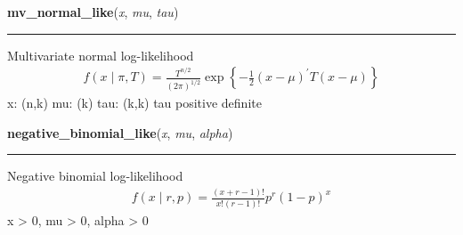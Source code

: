 \hspace{.8\funcindent}\begin{boxedminipage}{\funcwidth}

    \raggedright \textbf{mv\_normal\_like}(\textit{x}, \textit{mu}, \textit{tau})

    \vspace{-1.5ex}

    \rule{\textwidth}{1pt}
\setlength{\parskip}{2ex}

Multivariate normal log-likelihood
\begin{equation*}\begin{split}f(x \mid \pi, T) = \frac{T^{n/2}}{(2\pi)^{1/2}} \exp\left\{ -\frac{1}{2} (x-\mu)^{\prime}T(x-\mu) \right\}\end{split}\end{equation*}
x: (n,k)
mu: (k)
tau: (k,k)
tau positive definite
\setlength{\parskip}{1ex}
    \end{boxedminipage}

    \label{pymc:distributions:negative_binomial_like}

    \vspace{0.5ex}

\hspace{.8\funcindent}\begin{boxedminipage}{\funcwidth}

    \raggedright \textbf{negative\_binomial\_like}(\textit{x}, \textit{mu}, \textit{alpha})

    \vspace{-1.5ex}

    \rule{\textwidth}{1pt}
\setlength{\parskip}{2ex}

Negative binomial log-likelihood
\begin{equation*}\begin{split}f(x \mid r, p) = \frac{(x+r-1)!}{x! (r-1)!} p^r (1-p)^x\end{split}\end{equation*}
x {\textgreater} 0, mu {\textgreater} 0, alpha {\textgreater} 0
\setlength{\parskip}{1ex}
    \end{boxedminipage}

    \label{pymc:distributions:normal_like}

    \vspace{0.5ex}

